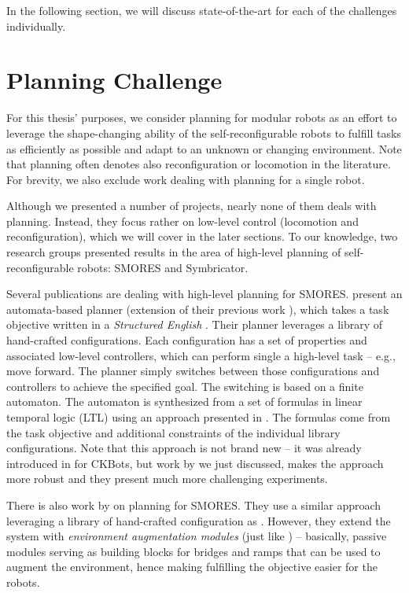 In the following section, we will discuss state-of-the-art for each of the
challenges individually.

\section{Planning Challenge}\label{sec:chal-planning}

For this thesis' purposes, we consider planning for modular robots as an effort
to leverage the shape-changing ability of the self-reconfigurable robots to
fulfill tasks as efficiently as possible and adapt to an unknown or changing
environment. Note that planning often denotes also reconfiguration or locomotion
in the literature. For brevity, we also exclude work dealing with planning for a
single robot.

Although we presented a number of projects, nearly none of them deals with
planning. Instead, they focus rather on low-level control (locomotion and
reconfiguration), which we will cover in the later sections. To our knowledge,
two research groups presented results in the area of high-level planning of
self-reconfigurable robots: SMORES and Symbricator.

Several publications are dealing with high-level planning for SMORES.
\textcite{DBLP:journals/arobots/JingTYK18} present an automata-based planner
(extension of their previous work \cite{DBLP:conf/ijcai/JingTYK17}), which takes
a task objective written in a \emph{Structured English}
\cite{DBLP:conf/iros/FinucaneJK10}. Their planner leverages a library of
hand-crafted configurations. Each configuration has a set of properties and
associated low-level controllers, which can perform single a high-level task --
e.g., move forward. The planner simply switches between those configurations and
controllers to achieve the specified goal. The switching is based on a finite
automaton. The automaton is synthesized from a set of formulas in linear
temporal logic (LTL) using an approach presented in
\cite{DBLP:journals/trob/Kress-GazitFP09}. The formulas come from the task
objective and additional constraints of the individual library configurations.
Note that this approach is not brand new -- it was already introduced in
\cite{DBLP:conf/iros/CastroKK11} for CKBots, but work by
\textcite{DBLP:journals/arobots/JingTYK18} we just discussed, makes the approach
more robust and they present much more challenging experiments.

There is also work by \textcite{DBLP:conf/icra/TosunDJKCY18} on planning for
SMORES. They use a similar approach leveraging a library of hand-crafted
configuration as \cite{DBLP:journals/arobots/JingTYK18}. However, they extend
the system with \emph{environment augmentation modules} (just like
\cite{DBLP:conf/rss/PetersenNW11}) -- basically, passive modules serving as
building blocks for bridges and ramps that can be used to augment the
environment, hence making fulfilling the objective easier for the robots.

